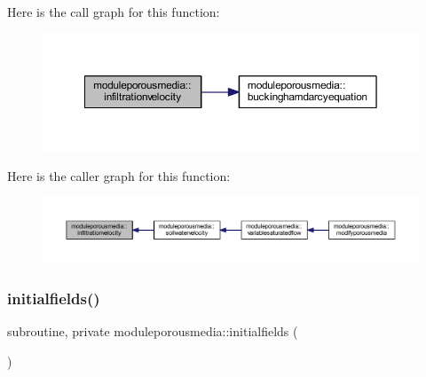 Here is the call graph for this function\+:\nopagebreak
\begin{figure}[H]
\begin{center}
\leavevmode
\includegraphics[width=350pt]{namespacemoduleporousmedia_a42b31332e78c6e4efb8f6b4c8c1bc569_cgraph}
\end{center}
\end{figure}
Here is the caller graph for this function\+:\nopagebreak
\begin{figure}[H]
\begin{center}
\leavevmode
\includegraphics[width=350pt]{namespacemoduleporousmedia_a42b31332e78c6e4efb8f6b4c8c1bc569_icgraph}
\end{center}
\end{figure}
\mbox{\label{namespacemoduleporousmedia_a35c831104f825a9f11f297800f87ecab}} 
\subsubsection{\texorpdfstring{initialfields()}{initialfields()}}
{\footnotesize\ttfamily subroutine, private moduleporousmedia\+::initialfields (\begin{DoxyParamCaption}{ }\end{DoxyParamCaption})\hspace{0.3cm}{\ttfamily [private]}}

